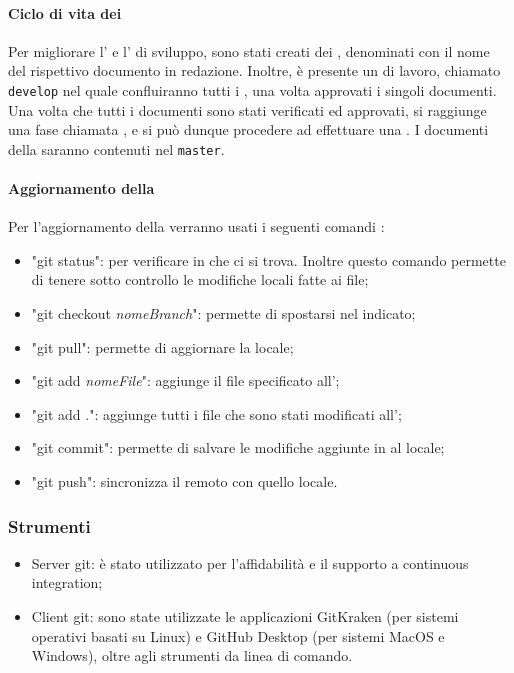 \paragraph{Ciclo di vita dei }
Per migliorare l' e l' di sviluppo, sono stati creati dei , denominati con il nome del rispettivo documento in redazione.
Inoltre, è presente un  di lavoro, chiamato \texttt{develop} nel quale confluiranno tutti i , una volta approvati i singoli documenti.
Una volta che tutti i documenti sono stati verificati ed approvati, si raggiunge una fase chiamata , e si può dunque procedere ad effettuare una . 
I documenti della saranno contenuti nel  \texttt{master}.
\paragraph{Aggiornamento della }
Per l’aggiornamento della  verranno usati i seguenti comandi :
\begin{itemize}
	\item "git status": per verificare in che  ci si trova. Inoltre questo  	comando permette di tenere sotto controllo le modifiche locali fatte ai file;
	\item "git checkout \emph{nomeBranch}": permette di spostarsi nel  indicato;
	\item "git pull": permette di aggiornare la  locale;
	\item "git add \emph{nomeFile}": aggiunge il file specificato all';
	\item "git add .": aggiunge tutti i file che sono stati modificati all';
	\item "git commit": permette di salvare le modifiche aggiunte in  al  locale;
	\item "git push": sincronizza il  remoto con quello locale.
\end{itemize}
\subsubsection{Strumenti}
\begin{itemize}
	\item Server git: è stato utilizzato  per l’affidabilità e il supporto a continuous integration;
	\item Client git: sono state utilizzate le applicazioni GitKraken (per sistemi operativi basati su Linux) e GitHub Desktop (per sistemi MacOS e Windows), oltre agli strumenti da linea di comando.
\end{itemize}
